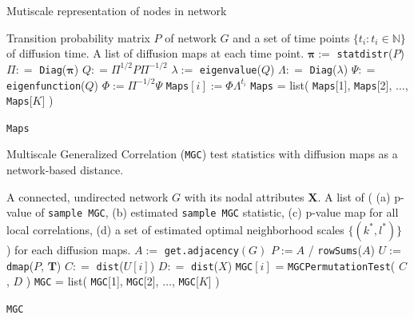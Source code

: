 \documentclass[11pt]{article}
\theoremstyle{definition}
\begin{document}
\begin{algorithm}[H]
	\caption{Mutiscale representation of nodes in network}
	\begin{algorithmic}[1]
		\Require Transition probability matrix $P$ of network $G$ and a set of time points $\{ t_{i}  : t_{i} \in \mathbb{N} \}$  of diffusion time. 
		\Ensure A list of diffusion maps at each time point.
		\State $\mathbf{\pi} :=$ \texttt{statdistr}($P$) 
		\State $\Pi : =$ \texttt{Diag}($\mathbf{\pi}$)
		\State $Q: = \Pi^{1/2} P \Pi^{-1/2}$ 
		\State $\lambda := $ \texttt{eigenvalue}($Q$)
		\State $\Lambda : =$ \texttt{Diag}($\lambda$)
		\State $\Psi : =$ \texttt{eigenfunction}($Q$) 
		\State $\Phi :=  \Pi^{-1/2} \Psi$
		\Begin
		\State \texttt{Maps}$[i] := \Phi \Lambda^{t_{i}}$  
		\End
		\EndFor
		\State \texttt{Maps} = list( \texttt{Maps}[1], \texttt{Maps}[2], $\ldots$, \texttt{Maps}[$K$]  )
		
		\Return \texttt{Maps}
		\EndFunction
	\end{algorithmic}
\end{algorithm}

\begin{algorithm}[H]
	\caption{Multiscale Generalized Correlation (\texttt{MGC}) test statistics with diffusion maps as a network-based distance.}
	\begin{algorithmic}[1]
		\Require A connected, undirected network $G$ with its nodal attributes $\mathbf{X}$.
		\Ensure A list of \big(  (a) p-value of \texttt{sample MGC}, (b) estimated \texttt{sample MGC} statistic, (c) p-value map for all local correlations, (d) a set of estimated optimal neighborhood scales $\{  (k^{*}, l^{*}  ) \}$  \big) for each diffusion maps.
		\State $A :=$ \texttt{get.adjacency}$(G)$
		\State $P := A $ / \texttt{rowSums}($A$) 
		\State $U :=$ \texttt{dmap}($P$, $\mathbf{T}$) 
		\Begin
		\State $C : =$  \texttt{dist}($U[i]$) 
		\State $D : =$ \texttt{dist}($X$) 
		\State \texttt{MGC}$[i]$ = \texttt{MGCPermutationTest}( $C$, $D$ ) 
		\End
		\EndFor
		\State \texttt{MGC} = list( \texttt{MGC}[1], \texttt{MGC}[2], $\ldots$, \texttt{MGC}[$K$]  )
		
		\Return \texttt{MGC}
		\EndFunction
	\end{algorithmic}
\end{algorithm}
\end{document}
